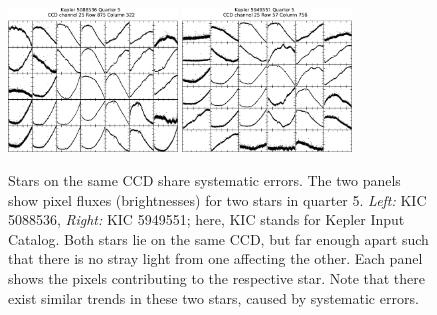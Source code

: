 \documentclass[12pt, preprint]{aastex}
\begin{document}
\begin{figure}[p]
\begin{center}
\includegraphics[width=0.4\textwidth]{f1a}
\includegraphics[width=0.4\textwidth]{f1b}
\end{center}
\caption{
  \label{ccd} 
  Stars on the same CCD share systematic errors. 
  The two panels show pixel fluxes (brightnesses) for two stars in quarter 5. \emph{Left:} KIC 5088536, \emph{Right:} KIC 5949551; 
  here, KIC stands for Kepler Input Catalog. Both stars lie on the same CCD, 
  but far enough apart such that there is no stray light from one affecting the other. 
  Each panel shows the pixels contributing to the respective star.
  Note that there exist similar trends in these two stars, caused by systematic errors. 
}
\end{figure}
\end{document}
